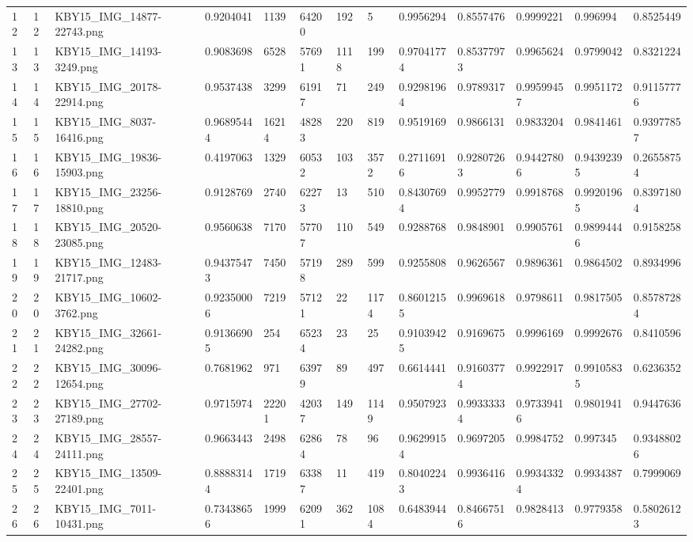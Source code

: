 \documentclass[11pt, a4paper, twoside]{report}
\begin{document}
\begin{longtable}[c]{@{}lllllllllllll@{}}
12 & 12 & KBY15\_IMG\_14877-22743.png & 0.9204041 & 1139 & 64200 & 192 & 5 & 0.9956294 & 0.8557476 & 0.9999221 & 0.996994 & 0.8525449 \\
13 & 13 & KBY15\_IMG\_14193-3249.png & 0.9083698 & 6528 & 57691 & 1118 & 199 & 0.97041774 & 0.85377973 & 0.9965624 & 0.9799042 & 0.8321224 \\
14 & 14 & KBY15\_IMG\_20178-22914.png & 0.9537438 & 3299 & 61917 & 71 & 249 & 0.92981964 & 0.9789317 & 0.99599457 & 0.9951172 & 0.91157776 \\
15 & 15 & KBY15\_IMG\_8037-16416.png & 0.96895444 & 16214 & 48283 & 220 & 819 & 0.9519169 & 0.9866131 & 0.9833204 & 0.9841461 & 0.93977857 \\
16 & 16 & KBY15\_IMG\_19836-15903.png & 0.4197063 & 1329 & 60532 & 103 & 3572 & 0.27116916 & 0.92807263 & 0.94427806 & 0.94392395 & 0.26558754 \\
17 & 17 & KBY15\_IMG\_23256-18810.png & 0.9128769 & 2740 & 62273 & 13 & 510 & 0.84307694 & 0.9952779 & 0.9918768 & 0.99201965 & 0.83971804 \\
18 & 18 & KBY15\_IMG\_20520-23085.png & 0.9560638 & 7170 & 57707 & 110 & 549 & 0.9288768 & 0.9848901 & 0.9905761 & 0.98994446 & 0.9158258 \\
19 & 19 & KBY15\_IMG\_12483-21717.png & 0.94375473 & 7450 & 57198 & 289 & 599 & 0.9255808 & 0.9626567 & 0.9896361 & 0.9864502 & 0.8934996 \\
20 & 20 & KBY15\_IMG\_10602-3762.png & 0.92350006 & 7219 & 57121 & 22 & 1174 & 0.86012155 & 0.9969618 & 0.9798611 & 0.9817505 & 0.85787284 \\
21 & 21 & KBY15\_IMG\_32661-24282.png & 0.91366905 & 254 & 65234 & 23 & 25 & 0.91039425 & 0.9169675 & 0.9996169 & 0.9992676 & 0.8410596 \\
22 & 22 & KBY15\_IMG\_30096-12654.png & 0.7681962 & 971 & 63979 & 89 & 497 & 0.6614441 & 0.91603774 & 0.9922917 & 0.99105835 & 0.6236352 \\
23 & 23 & KBY15\_IMG\_27702-27189.png & 0.9715974 & 22201 & 42037 & 149 & 1149 & 0.9507923 & 0.99333334 & 0.97339416 & 0.9801941 & 0.9447636 \\
24 & 24 & KBY15\_IMG\_28557-24111.png & 0.9663443 & 2498 & 62864 & 78 & 96 & 0.96299154 & 0.9697205 & 0.9984752 & 0.997345 & 0.93488026 \\
25 & 25 & KBY15\_IMG\_13509-22401.png & 0.88883144 & 1719 & 63387 & 11 & 419 & 0.80402243 & 0.9936416 & 0.99343324 & 0.9934387 & 0.7999069 \\
26 & 26 & KBY15\_IMG\_7011-10431.png & 0.73438656 & 1999 & 62091 & 362 & 1084 & 0.6483944 & 0.84667516 & 0.9828413 & 0.9779358 & 0.58026123 \\

\end{longtable}
\end{document}
